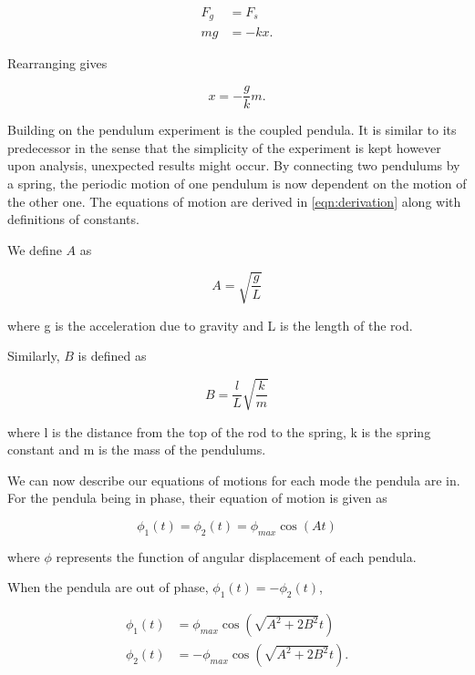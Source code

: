 \documentclass{article}
\begin{document}
\begin{equation}
    \begin{split}
        F_g &= F_s \\
        mg &= -kx.
    \end{split}
\end{equation}

Rearranging gives

\begin{equation} \label{eqn:hk}
    x = -\frac{g}{k}m.
\end{equation}

Building on the pendulum experiment is the coupled pendula. It is similar 
to its predecessor in the sense that the simplicity of the experiment is kept
however upon analysis, unexpected results might occur. By connecting two 
pendulums by a spring, the periodic motion of one pendulum is now dependent
on the motion of the other one. The equations of motion are derived in 
\ref{eqn:derivation} along with definitions of constants.

We define $A$ as

\begin{equation}
    A = \sqrt{\frac{g}{L}}
\end{equation}

where g is the acceleration due to gravity and L is the length of the rod.

Similarly, $B$ is defined as

\begin{equation}
    B = \frac{l}{L}\sqrt{\frac{k}{m}}
\end{equation}

where l is the distance from the top of the rod to the spring, k is the spring
constant and m is the mass of the pendulums.

We can now describe our equations of motions for each mode the pendula are in. 
For the pendula being in phase, their equation of motion is given as

\begin{equation} \label{eqn:ip}
    \phi_1(t) = \phi_2(t) = \phi_{max}\cos{(At)}
\end{equation}

where $\phi$ represents the function of angular displacement of each pendula.

When the pendula are out of phase, $\phi_1(t)=-\phi_2(t)$,

\begin{equation} \label{eqn:op}
    \begin{split}
        \phi_1(t)&=\phi_{max}\cos{\left(\sqrt{A^2+2B^2}t\right)} \\
        \phi_2(t)&=-\phi_{max}\cos{\left(\sqrt{A^2+2B^2}t\right)}.
    \end{split}
\end{equation}
\end{document}
